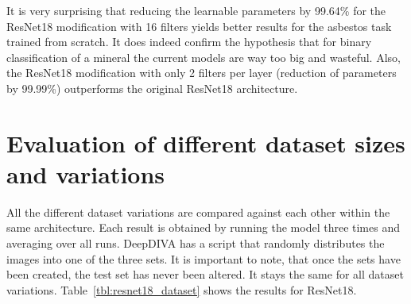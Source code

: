 \begin{table}[!h] \centering
{}
\caption{Resnet18 with different number of filters on the FINAL dataset. The number of filters present in paranthesis is the number of filters used per layer.}
\label{tbl:resnet18-different-filters}
\end{table}

It is very surprising that reducing the learnable parameters by 99.64\% for the ResNet18 modification with 16 filters yields better results for the asbestos task trained from scratch. It does indeed confirm the hypothesis that for binary classification of a mineral the current models are way too big and wasteful. Also, the ResNet18 modification with only 2 filters per layer (reduction of parameters by 99.99\%) outperforms the original ResNet18 architecture.






\section{Evaluation of different dataset sizes and variations}

All the different dataset variations are compared against each other within the same architecture. Each result is obtained by running the model three times and averaging over all runs. DeepDIVA has a script that randomly distributes the images into one of the three sets. It is important to note, that once the sets have been created, the test set has never been altered. It stays the same for all dataset variations. Table~\ref{tbl:resnet18_dataset} shows the results for ResNet18. \\

